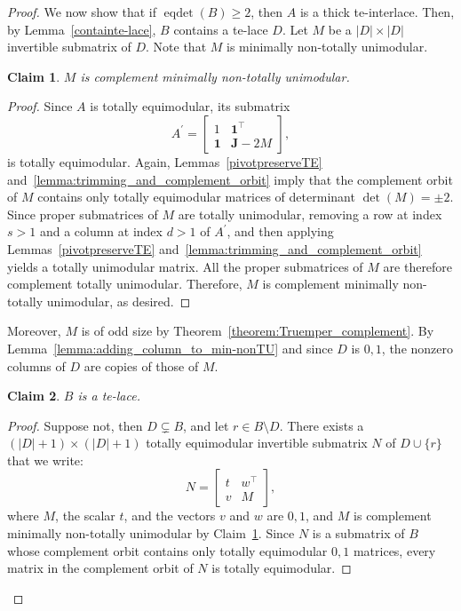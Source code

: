 \documentclass[11pt,a4paper]{amsart}
\renewcommand*{\geq}{\geqslant}
\theoremstyle{plain}
\newtheorem{claimnumb}{Claim}[theorem]{\itshape}{\rmfamily}
\theoremstyle{definition}
\DeclareMathOperator{\eqdet}{eqdet}
\begin{document}
\begin{proof}
We now show that if $\eqdet(B)\geq 2$, then $A$ is a thick te-interlace.
Then, by Lemma~\ref{containte-lace}, $B$ contains a te-lace $D$.
Let $M$ be a $|D|\times|D|$ invertible submatrix of $D$.
Note that $M$ is minimally non-totally unimodular.
\begin{claimnumb}\label{claim:M_is_complement_min-nonTU}
$M$ is complement minimally non-totally unimodular.
\end{claimnumb}
\begin{proof}
Since $A$ is totally equimodular, its submatrix $$A^\prime=\begin{bmatrix}
	1 & \mathbf{1}^\top \\
	\mathbf{1} &  \mathbf{J} -2M
\end{bmatrix},$$ is totally equimodular.
Again, Lemmas~\ref{pivotpreserveTE} and~\ref{lemma:trimming_and_complement_orbit} imply that the complement orbit of $M$ contains only totally equimodular matrices of determinant $\det(M)=\pm2$.
Since proper submatrices of $M$ are totally unimodular, removing a row at index $s>1$ and a column at index $d>1$ of $A^\prime$, and then applying Lemmas~\ref{pivotpreserveTE} and~\ref{lemma:trimming_and_complement_orbit} yields a totally unimodular matrix.
All the proper submatrices of $M$ are therefore complement totally unimodular.
Therefore, $M$ is complement minimally non-totally unimodular, as desired.
\end{proof}
Moreover, $M$ is of odd size by Theorem~\ref{theorem:Truemper_complement}.
By Lemma~\ref{lemma:adding_column_to_min-nonTU} and since $D$ is $0,\!1$,  the nonzero columns of $D$ are copies of those of $M$.
\begin{claimnumb}\label{claim:B_is_te-lace}
$B$ is a te-lace.
\end{claimnumb}
\begin{proof}
Suppose not, then $D\subsetneq B$, and let $r\in B\setminus D$.
There exists a $(|D|+1)\times (|D|+1)$ totally equimodular invertible submatrix $N$ of $D\cup \{r\}$ that we write:
$$N = \begin{bmatrix}
	t& w^\top \\v & M
\end{bmatrix},$$
where $M$, the scalar $t$, and the vectors $v$ and $w$ are $0,\!1$, and $M$ is complement minimally non-totally unimodular by Claim~\ref{claim:M_is_complement_min-nonTU}.
Since $N$ is a submatrix of $B$ whose complement orbit contains only totally equimodular $0,1$ matrices, every matrix in the complement orbit of $N$ is totally equimodular.


\end{proof}
\end{proof}
\end{document}
